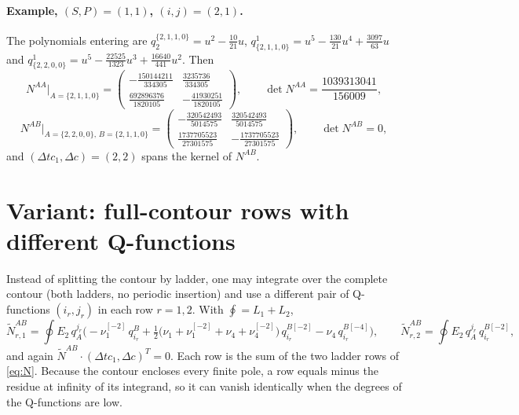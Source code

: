 \documentclass[11pt]{article}
\newcommand{\shift}[1]{^{[#1]}}
\begin{document}
\paragraph{Example, $(S,P)=(1,1)$, $(i,j)=(2,1)$.} The polynomials entering are
$q_2^{\{2,1,1,0\}}=u^2-\tfrac{10}{21}u$,
$q^1_{\{2,1,1,0\}}=u^5-\tfrac{130}{21}u^4+\tfrac{3097}{63}u$ and
$q^1_{\{2,2,0,0\}}=u^5-\tfrac{22525}{1323}u^3+\tfrac{16640}{441}u^2$. Then
\begin{equation}
N^{AA}\big|_{A=\{2,1,1,0\}}=
\begin{pmatrix}-\frac{150144211}{334305} & \frac{3235736}{334305}\\[3pt]
\frac{692896376}{1820105} & -\frac{41930251}{1820105}\end{pmatrix},\qquad
\det N^{AA}=\frac{1039313041}{156009},
\end{equation}
\begin{equation}
N^{AB}\big|_{A=\{2,2,0,0\},\,B=\{2,1,1,0\}}=
\begin{pmatrix}-\frac{320542493}{5014575} & \frac{320542493}{5014575}\\[3pt]
\frac{1737705523}{27301575} & -\frac{1737705523}{27301575}\end{pmatrix},\qquad
\det N^{AB}=0,
\end{equation}
and $(\Delta tc_1,\Delta c)=(2,2)$ spans the kernel of $N^{AB}$.

\section{Variant: full-contour rows with different Q-functions}
\label{sec:full}

Instead of splitting the contour by ladder, one may integrate over the complete contour (both
ladders, no periodic insertion) and use a different pair of Q-functions $(i_r,j_r)$ in each row
$r=1,2$. With $\oint=L_1+L_2$,
\begin{equation}
\tilde N^{AB}_{r,1}=\oint E_2\,q^{j_r}_A\Big(-\nu_1\shift{-2}\,q^B_{i_r}
+\tfrac12\big(\nu_1+\nu_1\shift{-2}+\nu_4+\nu_4\shift{-2}\big)\,q_{i_r}^{B[-2]}
-\nu_4\,q_{i_r}^{B[-4]}\Big),\qquad
\tilde N^{AB}_{r,2}=\oint E_2\,q^{j_r}_A\,q_{i_r}^{B[-2]},
\label{eq:Nfull}
\end{equation}
and again $\tilde N^{AB}\cdot(\Delta tc_1,\Delta c)^T=0$. Each row is the sum of the two ladder rows
of \eqref{eq:N}. Because the contour encloses every finite pole, a row equals minus the residue at
infinity of its integrand, so it can vanish identically when the degrees of the Q-functions are low.
\end{document}

